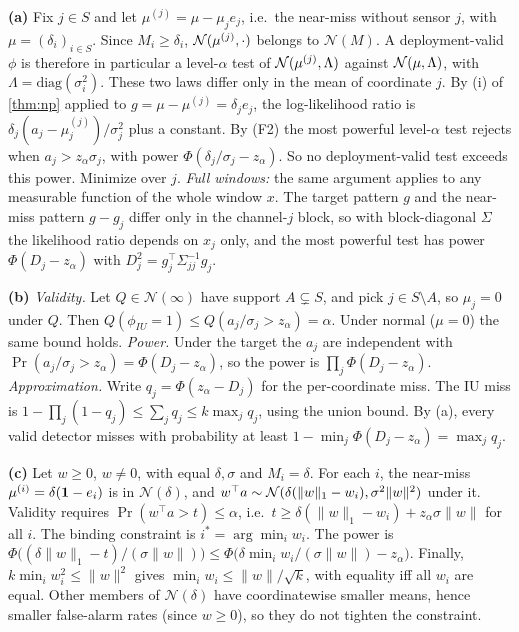 \textbf{(a)} Fix $j\in S$ and let $\mu^{(j)}=\mu-\mu_je_j$, i.e.\ the near-miss without sensor $j$, with $\mu=(\delta_i)_{i\in S}$. Since $M_i\ge\delta_i$, $\mathcal{N}(\mu^{(j)},\cdot)$ belongs to $\mathcal N(M)$. A deployment-valid $\phi$ is therefore in particular a level-$\alpha$ test of $\mathcal{N}(\mu^{(j)},\Lambda)$ against $\mathcal{N}(\mu,\Lambda)$, with $\Lambda=\mathrm{diag}(\sigma_i^2)$. These two laws differ only in the mean of coordinate $j$. By (i) of \cref{thm:np} applied to $g=\mu-\mu^{(j)}=\delta_je_j$, the log-likelihood ratio is $\delta_j(a_j-\mu^{(j)}_j)/\sigma_j^2$ plus a constant. By (F2) the most powerful level-$\alpha$ test rejects when $a_j>z_\alpha\sigma_j$, with power $\Phi(\delta_j/\sigma_j-z_\alpha)$. So no deployment-valid test exceeds this power. Minimize over $j$. \emph{Full windows:} the same argument applies to any measurable function of the whole window $x$. The target pattern $g$ and the near-miss pattern $g-g_j$ differ only in the channel-$j$ block, so with block-diagonal $\Sigma$ the likelihood ratio depends on $x_j$ only, and the most powerful test has power $\Phi(D_j-z_\alpha)$ with $D_j^2=g_j^\top\Sigma_{jj}^{-1}g_j$.

\textbf{(b)} \emph{Validity.} Let $Q\in\mathcal N(\infty)$ have support $A\subsetneq S$, and pick $j\in S\setminus A$, so $\mu_j=0$ under $Q$. Then $Q(\phi_{IU}=1)\le Q(a_j/\sigma_j>z_\alpha)=\alpha$. Under normal ($\mu=0$) the same bound holds. \emph{Power.} Under the target the $a_j$ are independent with $\Pr(a_j/\sigma_j>z_\alpha)=\Phi(D_j-z_\alpha)$, so the power is $\prod_j\Phi(D_j-z_\alpha)$. \emph{Approximation.} Write $q_j=\Phi(z_\alpha-D_j)$ for the per-coordinate miss. The IU miss is $1-\prod_j(1-q_j)\le\sum_jq_j\le k\max_jq_j$, using the union bound. By (a), every valid detector misses with probability at least $1-\min_j\Phi(D_j-z_\alpha)=\max_jq_j$.

\textbf{(c)} Let $w\ge0$, $w\ne0$, with equal $\delta,\sigma$ and $M_i=\delta$. For each $i$, the near-miss $\mu^{(i)}=\delta(\mathbf{1}-e_i)$ is in $\mathcal N(\delta)$, and $w^\top a\sim\mathcal{N}(\delta(\|w\|_1-w_i),\sigma^2\|w\|^2)$ under it. Validity requires $\Pr(w^\top a>t)\le\alpha$, i.e.\ $t\ge\delta(\|w\|_1-w_i)+z_\alpha\sigma\|w\|$ for all $i$. The binding constraint is $i^*=\arg\min_iw_i$. The power is $\Phi\big((\delta\|w\|_1-t)/(\sigma\|w\|)\big)\le\Phi\big(\delta\min_iw_i/(\sigma\|w\|)-z_\alpha\big)$. Finally, $k\min_iw_i^2\le\|w\|^2$ gives $\min_iw_i\le\|w\|/\sqrt k$, with equality iff all $w_i$ are equal. Other members of $\mathcal N(\delta)$ have coordinatewise smaller means, hence smaller false-alarm rates (since $w\ge0$), so they do not tighten the constraint.

